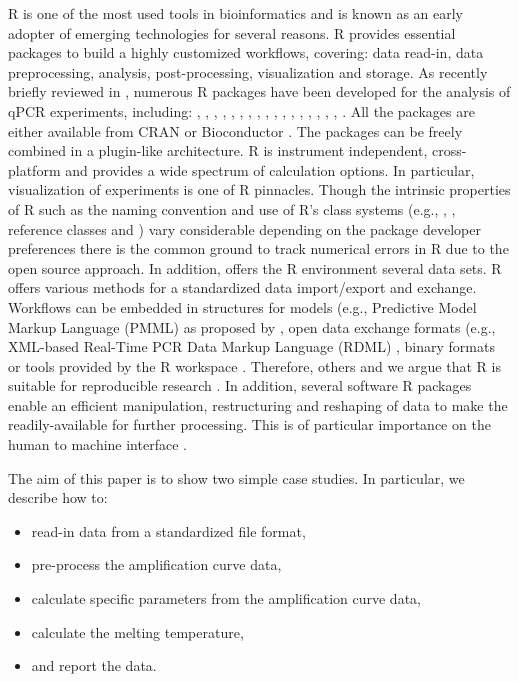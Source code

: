 R is one of the most used tools in bioinformatics and is known as an early 
adopter of emerging technologies \citep{pabinger_2014} for several reasons. R 
provides essential packages to build a highly customized workflows, covering: 
data read-in, data preprocessing, analysis, post-processing, visualization and 
storage. As recently briefly reviewed in \citet{pabinger_2014}, numerous R 
packages have been developed for the analysis of qPCR experiments, including: 
, , , , 
, , , , 
, , , , 
, , , , 
, . All the packages are either available from 
CRAN or Bioconductor \citep{gentleman_2004}. The packages can be freely combined 
in a plugin-like architecture. R is instrument independent, cross-platform and 
provides a wide spectrum of calculation options. In particular, visualization of 
experiments is one of R pinnacles. Though the intrinsic properties of R such as 
the naming convention \citep{Baaaath_2012} and use of R's class systems (e.g., 
, , reference classes and ) vary considerable 
depending on the package developer preferences there is the common ground to 
track numerical errors in R due to the open source approach. In addition, offers 
the R environment several data sets. R offers various methods for a standardized 
data import/export and exchange. Workflows can be embedded in structures for 
models (e.g., Predictive Model Markup Language (PMML) as proposed by 
\citet{Guazzelli_2009}, open data exchange formats (e.g., XML-based Real-Time 
PCR Data Markup Language (RDML) \citep{lefever_2009}, binary formats 
\citep{michna_2013} or tools provided by the R workspace \citep{RDCT2010c}. 
Therefore, others and we argue that R is suitable for reproducible research 
\citep{Gesmann_2011, Murrell_2012, gandrud_2013, hofmann_2013, Leeper_2014, 
liu_2014}. In addition, several software R packages enable an efficient 
manipulation, restructuring and reshaping of data to make the readily-available 
for further processing. This is of particular importance on the human to machine 
interface \citep{Oh_2014}.

The aim of this paper is to show two simple case studies. In 
particular, we describe how to:
\begin{itemize}
 \item read-in data from a standardized file format,
 \item pre-process the amplification curve data,
 \item calculate specific parameters from the amplification curve data,
 \item calculate the melting temperature,
 \item and report the data.
\end{itemize}

